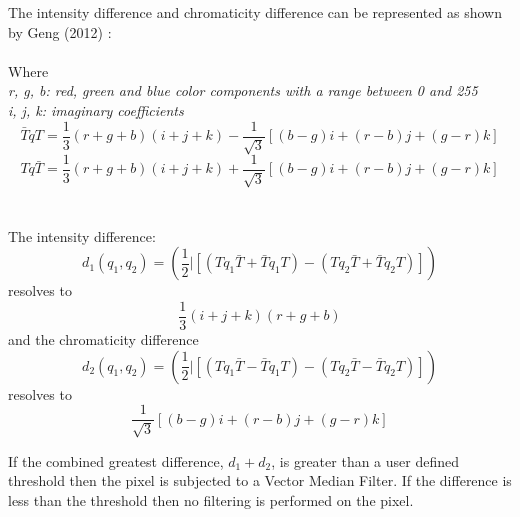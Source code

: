 \begin{description}
The intensity difference and chromaticity difference can be represented as shown by Geng (2012) \cite{Geng2012150}:
\\
\\ Where
\\ \textit{r, g, b: red, green and blue color components with a range between 0 and 255}
\\ \textit{i, j, k: imaginary coefficients}
\begin{equation}
\bar{T}qT = \frac{1}{3}(r+g+b)(i+j+k)-\frac{1}{\sqrt{3}}[(b-g)i+(r-b)j+(g-r)k]
\end{equation}
\begin{equation}
Tq\bar{T} = \frac{1}{3}(r+g+b)(i+j+k)+\frac{1}{\sqrt{3}}[(b-g)i+(r-b)j+(g-r)k]
\end{equation}
\\
\\
The intensity difference:
\begin{equation}
d_1(q_1,q_2)=(\frac{1}{2}|[(Tq_1\bar{T}+\bar{T}q_1T)-(Tq_2\bar{T}+\bar{T}q_2T)])
\end{equation}
resolves to
\begin{equation}
\frac{1}{3}(i+j+k)(r+g+b)
\end{equation}
and the chromaticity difference
\begin{equation}
d_2(q_1,q_2)=(\frac{1}{2}|[(Tq_1\bar{T}-\bar{T}q_1T)-(Tq_2\bar{T}-\bar{T}q_2T)])
\end{equation}
resolves to
\begin{equation}
\frac{1}{\sqrt{3}}[(b-g)i+(r-b)j+(g-r)k]
\end{equation}

If the combined greatest difference, $d_1 + d_2$, is greater than a user defined threshold then the pixel is subjected to a Vector Median Filter. If the difference is less than the threshold then no filtering is performed on the pixel.
\end{description}
 
